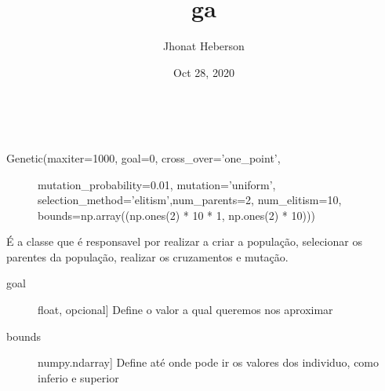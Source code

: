 \documentclass[letterpaper,10pt,english]{sphinxmanual}
\title{ga}
\date{Oct 28, 2020}
\author{Jhonat Heberson}
\begin{document}
\pagestyle{empty}
\sphinxmaketitle
\pagestyle{plain}
\sphinxtableofcontents
\pagestyle{normal}
\label{\detokenize{index::doc}}


\begin{fulllineitems}
\label{\detokenize{index:ga.Genetic}}~\begin{description}
\item[{Genetic(maxiter=1000, goal=0, cross\_over=’one\_point’,}] \leavevmode
mutation\_probability=0.01, mutation=’uniform’,
selection\_method=’elitism’,num\_parents=2,
num\_elitism=10, bounds=np.array((np.ones(2) * 10 * \sphinxhyphen{}1, np.ones(2) * 10)))

\end{description}

É a classe que é responsavel por realizar a criar a população, 
selecionar os parentes da população, realizar os cruzamentos e mutação.
\begin{description}
\item[{goal}] \leavevmode{[}float, opcional{]}
Define o valor a qual queremos nos aproximar

\item[{bounds}] \leavevmode{[}numpy.ndarray{]}
Define até onde pode ir os valores dos individuo, como inferio e superior


\end{description}
\end{fulllineitems}
\end{document}
